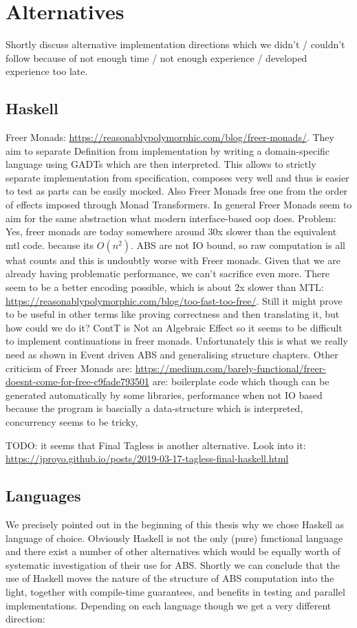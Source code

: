 \section{Alternatives}
\label{sec:alternatives}

Shortly discuss alternative implementation directions which we didn't / couldn't follow because of not enough time / not enough experience / developed experience too late. 

\subsection{Haskell}
Freer Monads: \url{https://reasonablypolymorphic.com/blog/freer-monads/}. They aim to separate Definition from implementation by writing a domain-specific language using GADTs which are then interpreted. This allows to strictly separate implementation from specification, composes very well and thus is easier to test as parts can be easily mocked. Also Freer Monads free one from the order of effects imposed through Monad Transformers. In general Freer Monads seem to aim for the same abstraction what modern interface-based oop does.
Problem: Yes, freer monads are today somewhere around 30x slower than the equivalent mtl code. because its $O(n^2)$. ABS are not IO bound, so raw computation is all what counts and this is undoubtly worse with Freer monads. Given that we are already having problematic performance, we can't sacrifice even more. There seem to be a better encoding possible, which is about 2x slower than MTL: \url{https://reasonablypolymorphic.com/blog/too-fast-too-free/}. Still it might prove to be useful in other terms like proving correctness and then translating it, but how could we do it?  
ContT is Not an Algebraic Effect so it seems to be difficult to implement continuations in freer monads. Unfortunately this is what we really need as shown in Event driven ABS and generalising structure chapters.
Other criticism of Freer Monads are: \url{https://medium.com/barely-functional/freer-doesnt-come-for-free-c9fade793501} are: boilerplate code which though can be generated automatically by some libraries, performance when not IO based because the program is bascially a data-structure which is interpreted, concurrency seems to be tricky, 

TODO: it seems that Final Tagless is another alternative. Look into it: \url{https://jproyo.github.io/posts/2019-03-17-tagless-final-haskell.html}

\subsection{Languages}
We precisely pointed out in the beginning of this thesis why we chose Haskell as language of choice. Obviously Haskell is not the only (pure) functional language and there exist a number of other alternatives which would be equally worth of systematic investigation of their use for ABS. Shortly we can conclude that the use of Haskell moves the nature of the structure of ABS computation into the light, together with compile-time guarantees, and benefits in testing and parallel implementations. Depending on each language though we get a very different direction:

